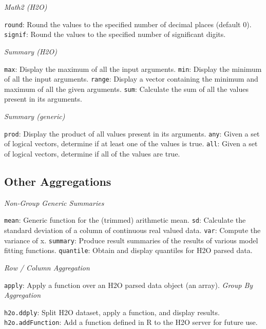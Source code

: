 \documentclass[11pt]{article}
\begin{document}
{{\emph{Math2 (H2O)}\par
{\texttt{round}}: Round the values to the specified number of decimal places (default 0). \newline
{\texttt{signif}}: Round the values to the specified number of significant digits.\newline

\emph{Summary (H2O)}\par
{\texttt{max}}: Display the maximum of all the input arguments. \newline
{\texttt{min}}: Display the minimum of all the input arguments. \newline
{\texttt{range}}: Display a vector containing the minimum and maximum of all the given arguments. \newline
{\texttt{sum}}: Calculate the sum of all the values present in its arguments.\newline

\emph{Summary (generic)}\par
{\texttt{prod}}: Display the product of all values present in its arguments. \newline
{\texttt{any}}: Given a set of logical vectors, determine if at least one of the values is true. \newline
{\texttt{all}}: Given a set of logical vectors, determine if all of the values are true.\newline

\subsection{Other Aggregations}

\emph{Non-Group Generic Summaries}\par
{\texttt{mean}}: Generic function for the (trimmed) arithmetic mean. \newline
{\texttt{sd}}: Calculate the standard deviation of a column of continuous real valued data. \newline
{\texttt{var}}: Compute the variance of x.\newline
{\texttt{summary}}: Produce result summaries of the results of various model fitting functions. \newline
{\texttt{quantile}}: Obtain and display quantiles for H2O parsed data.\newline

\emph{Row / Column Aggregation}\par
{\texttt{apply}: Apply a function over an H2O parsed data object (an array).\newline
\newpage
\emph{Group By Aggregation}\par
{\texttt{h2o.ddply}}: Split H2O dataset, apply a function, and display results.\newline
{\texttt{h2o.addFunction}}: Add a function defined in R to the H2O server for future use. \newline

}}}
\end{document}
